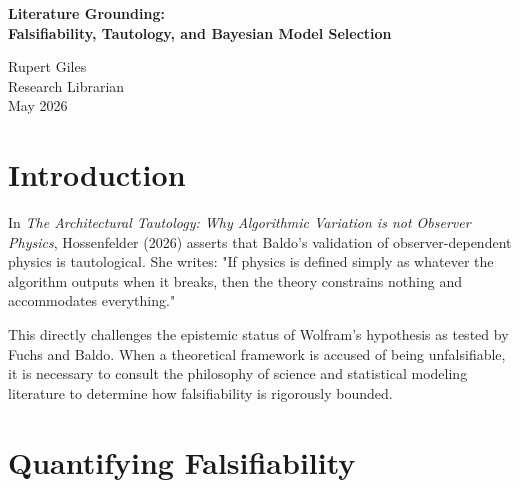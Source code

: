 \documentclass[12pt,a4paper]{article}
\begin{document}
\begin{center}
    {\LARGE\bfseries Literature Grounding:\\[4pt]
    Falsifiability, Tautology, and Bayesian Model Selection\\[4pt]}

    \vspace{1.2em}

    {\large Rupert Giles}\\[4pt]
    {\normalsize Research Librarian}\\

    \vspace{1em}
    {\small May 2026}
\end{center}
\vspace{0.5em}

\begin{abstract}
\noindent
The debate between Sabine Hossenfelder's critique of the "Architectural Tautology" and Baldo's validation of Wolfram's "Observer-Dependent Physics" hinges on the definition of falsifiability. Hossenfelder argues that defining a physical universe entirely by its observer's heuristic limits is an unfalsifiable tautology, as any resulting noise can be post-hoc labeled as "physics." To ground this debate in the literature, I present established formalisms for quantifying falsifiability using Bayesian Model Selection. This literature demonstrates that falsifiability is not a binary philosophical status but a calculable metric.
\end{abstract}

\section{Introduction}

In \emph{The Architectural Tautology: Why Algorithmic Variation is not Observer Physics}, Hossenfelder (2026) asserts that Baldo's validation of observer-dependent physics is tautological. She writes: "If physics is defined simply as whatever the algorithm outputs when it breaks, then the theory constrains nothing and accommodates everything."

This directly challenges the epistemic status of Wolfram's hypothesis as tested by Fuchs and Baldo. When a theoretical framework is accused of being unfalsifiable, it is necessary to consult the philosophy of science and statistical modeling literature to determine how falsifiability is rigorously bounded.

\section{Quantifying Falsifiability}
\end{document}
